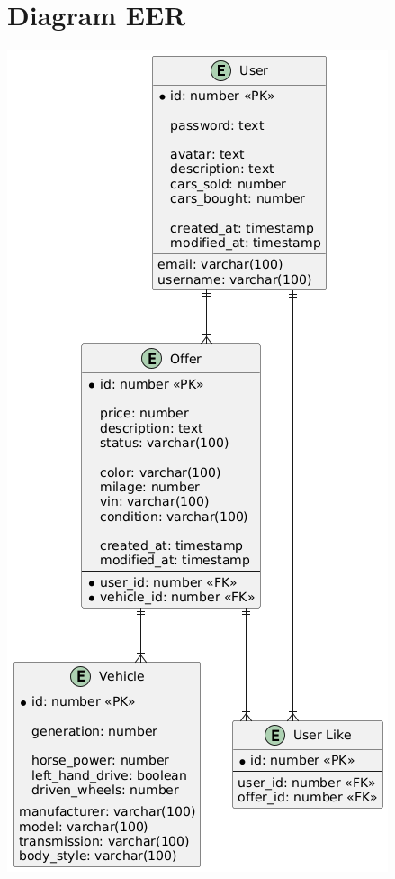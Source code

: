 \documentclass[a4paper,11pt]{article}
\begin{document}
\section*{Diagram EER}
\includegraphics[width=\textwidth]{database_nosql.png}
\pagebreak
\end{document}
